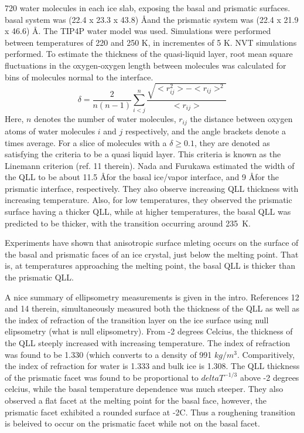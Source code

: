720 water molecules in each ice slab, exposing the basal and prismatic
surfaces. basal system was (22.4 x 23.3 x 43.8) \AA and the prismatic
system was (22.4 x 21.9 x 46.6) \AA. The TIP4P water model was
used. Simulations were performed between temperatures of 220 and 250
K, in incrementes of 5 K. NVT simulations performed. To estimate the
thickness of the quasi-liquid layer, root mean square fluctuations in
the oxygen-oxygen length between molecules was calculated for bins of
molecules normal to the interface.
\begin{equation}\label{eqNada1997-1}
\delta = \frac{2}{n(n-1)} \sum_{i<j}^{n}
\frac{\sqrt{<r_{ij}^{2}>-<r_{ij}>^{2}}}{<r_{ij}>}
\end{equation}
Here, $n$ denotes the number of water molecules, $r_{ij}$ the distance
between oxygen atoms of water molecules $i$ and $j$ respectively, and
the angle brackets denote a times average. For a slice of molecules
with a $\delta \ge 0.1$, they are denoted as satisfying the criteria
to be a quasi liquid layer. This criteria is known as the Linemann
criterion (ref. 11 therein). Nada and Furukawa estimated the width of
the QLL to be about 11.5 \AA for the basal ice/vapor interface, and 9
\AA for the prismatic interface, respectively. They also observe
increasing QLL thickness with increasing temperature. Also, for low
temperatures, they observed the prismatic surface having a thicker
QLL, while at higher temperatures, the basal QLL was predicted to be
thicker, with the transition occurring around 235~K. \cite{Nada1997}

Experiments have shown that anisotropic surface mleting occurs on the
surface of the basal and prismatic faces of an ice crystal, just below
the melting point. That is, at temperatures approaching the melting
point, the basal QLL is thicker than the prismatic QLL. 

A nice summary of ellipsometry measurements is given in the
intro. References 12 and 14 therein, simultaneously measured both the
thickness of the QLL as well as the index of refraction of the
transition layer on the ice surface using null elipsometry (what is
null elipsometry). From -2 degrees Celcius, the thickness of the QLL
steeply increased with increasing temperature. The index of refraction
was found to be 1.330 (which converts to a density of 991
$kg/m^{3}$. Comparitively, the index of refraction for water is 1.333
and bulk ice is 1.308. The QLL thickness of the prismatic facet was
found to be proportional to $delta T ^{-1/3}$ above -2 degrees
celcius, while the basal temperature dependence was much steeper. They
also observed a flat facet at the melting point for the basal face,
however, the prismatic facet exhibited a rounded surface at -2C. Thus
a roughening transition is beleived to occur on the prismatic facet
while not on the basal facet.\cite{Furukawa1997} 

